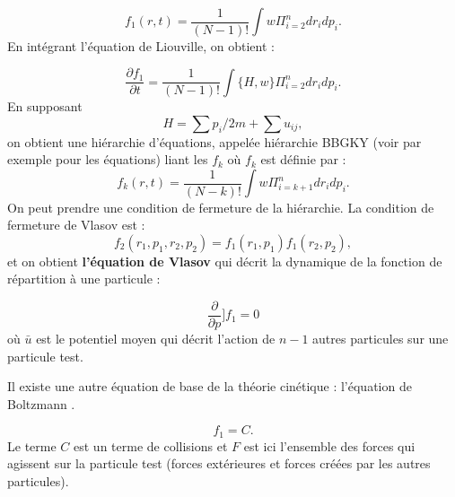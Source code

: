 \documentclass{book}
\begin{document}
\begin{equation}
f_1(r,t)=\frac{1}{(N-1)!}\int w \Pi_{i=2}^n d r_i d p_i.
\end{equation}
En int\'egrant l'\'equation de 
Liouville, on obtient :

\begin{equation}
\frac{\partial f_1}{\partial t}=\frac{1}{(N-1)!}\int \{H,w\} \Pi_{i=2}^n d r_i d p_i.
\end{equation}
En supposant 
\begin{equation}
H=\sum p_i/2m+\sum u_{i j},
\end{equation}
on obtient une hi\'erarchie d'\'equations, appel\'ee hi\'erarchie
BBGKY (voir 
par exemple \cite{Diu89} pour les \'equations) liant les $f_k$ o\`u
$f_k$ est d\'efinie par :
\begin{equation}
f_k(r,t)=\frac{1}{(N - k)!}\int w \Pi_{i=k+1}^n d r_i d p_i.
\end{equation}
On peut prendre une condition de fermeture de la hi\'erarchie.
La condition de fermeture de Vlasov est  :
\begin{equation}
f_2(r_1,p_1,r_2,p_2)=f_1(r_1,p_1)f_1(r_2,p_2),
\end{equation}
et on obtient {\bf l'\'equation de Vlasov}
 qui d\'ecrit la dynamique 
de la fonction de r\'epartition
 \`a une particule :

\begin{equation}
[\frac{\partial}{\partial t}+\frac{p}{m}\frac{\partial}{\partial r}+[F-\frac{\partial \bar{u}}{\partial r}]\frac{\partial }{\partial p}]f_1=0
\end{equation}
o\`u $\bar{u}$ est le potentiel moyen qui d\'ecrit l'action de $n-1$
autres particules sur une particule test.

Il existe une autre \'equation de base de la th\'eorie cin\'etique :
l'\'equation de Boltzmann \cite{Braginskii65,Diu89}.

\begin{equation}
[\frac{\partial}{\partial t}+\frac{p}{m}\frac{\partial}{\partial r}+F\frac{\partial }{\partial p}]f_1=C.
\end{equation}
Le terme $C$ est un terme de collisions \cite{Braginskii65} et $F$ est
ici l'ensemble des forces qui agissent sur la particule test (forces
ext\'erieures et forces cr\'e\'ees par les autres particules).
\end{document}
